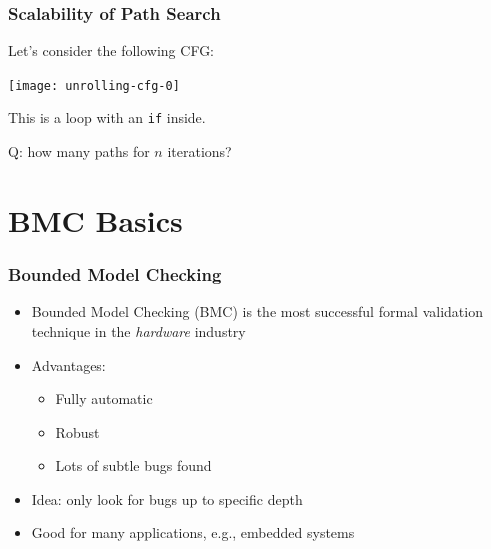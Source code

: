 
\begin{frame}
\frametitle{Scalability of Path Search}

Let's consider the following CFG:

\begin{center}
 \texttt{[image: unrolling-cfg-0]}
\end{center}

This is a loop with an {\tt if} inside.
\vfill
\pause

{\color{ta3scarletred}Q: how many paths for $n$ iterations?}

\end{frame}


\section{BMC Basics}

\begin{frame}
\frametitle{Bounded Model Checking}

\begin{itemize}
\item Bounded Model Checking (BMC) is the most successful formal
validation technique in the \emph{hardware} industry
\vfill

\item Advantages:
\begin{itemize}
\item[\mycheck] \alert{Fully automatic}
\item[\mycheck] \alert{Robust}
\item[\mycheck] \alert{Lots of subtle bugs found}
\end{itemize}
\vfill

\item Idea: only look for bugs \alert{up to specific depth}
\vfill

\item Good for many applications, e.g., embedded systems

\end{itemize}
\end{frame}

